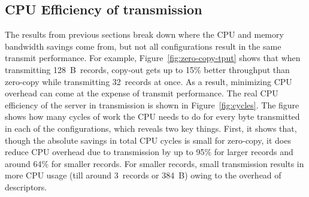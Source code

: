 

\subsection {CPU Efficiency of transmission}

The results from previous sections break down where the CPU and memory bandwidth savings come from,
but not all configurations result in the same transmit performance. For
example, Figure~\ref{fig:zero-copy-tput} shows that when transmitting
128~B~records, copy-out gets up to 15\% better throughput than zero-copy while transmitting
32~records at once. As a result, minimizing CPU overhead can come at the expense of transmit
performance.  The real CPU efficiency of the server in transmission is shown in
Figure~\ref{fig:cycles}. The figure shows how many cycles of work the CPU needs to do
for every byte transmitted in each of the configurations, which reveals two key things.
First, it shows that, though the absolute savings in total CPU cycles is small
for zero-copy, it does reduce CPU overhead due to transmission by up to 95\% for 
larger records and around 64\% for smaller records. For smaller records, small transmission
results in more CPU usage (till around 3~records or 384~B) owing to the overhead of descriptors.



%

